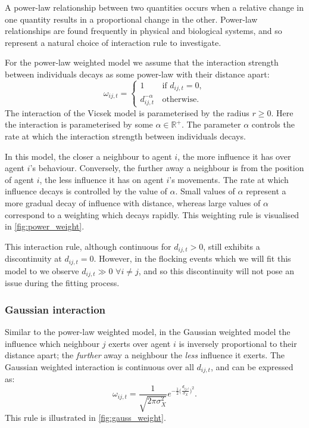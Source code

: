 A power-law relationship between two quantities occurs when a relative
change in one quantity results in a proportional change in the other.
Power-law relationships are found frequently in physical and biological
systems, and so represent a natural choice of interaction rule to investigate.

For the power-law weighted model we assume that the interaction strength
between individuals decays as some power-law with their distance
apart:
\begin{equation}
  \label{eq:power_law_interaction}
  \omega_{ij,t} =
  \begin{cases}
    1                  & \, \text{if } d_{ij,t} = 0, \\
	d_{ij,t}^{-\alpha} & \, \text{otherwise}.
  \end{cases}
\end{equation}
The interaction of the Vicsek model is parameterised by the radius $r \geq 0$.
Here the interaction is parameterised by some $\alpha\in\mathbb{R}^+$. The
parameter $\alpha$ controls the rate at which the interaction strength between
individuals decays. 

In this model, the closer a neighbour to agent $i$, the more influence it has
over agent $i$'s behaviour. Conversely, the further away a neighbour is from
the position of agent $i$, the less influence it has on agent $i$'s movements.
The rate at which influence decays is controlled by the value of $\alpha$.
Small values of $\alpha$ represent a more gradual decay of influence with
distance, whereas large values of $\alpha$ correspond to a weighting which
decays rapidly. This weighting rule is visualised in \cref{fig:power_weight}.

This interaction rule, although continuous for $d_{ij,t} > 0$, still exhibits a
discontinuity at $d_{ij,t}=0$. However, in the flocking events which we will
fit this model to we observe $d_{ij,t}\gg0$ $\forall i \neq j$, and so this
discontinuity will not pose an issue during the fitting process.

\subsubsection{Gaussian interaction}

Similar to the power-law weighted model, in the Gaussian weighted model the
influence which neighbour $j$ exerts over agent $i$ is inversely proportional
to their distance apart; the \emph{further} away a neighbour the \emph{less}
influence it exerts. The Gaussian weighted interaction is continuous over all
$d_{ij,t}$, and can be expressed as:
\begin{equation}
  \label{eq:gaussian_interaction}
  \omega_{ij,t} =
	\frac{1}{\sqrt{2\pi\sigma_X^2}}
	e^{-\frac{1}{2}\big(\frac{d_{ij,t}}{\sigma_X}\big)^2}.
\end{equation}
This rule is illustrated in \cref{fig:gauss_weight}.

